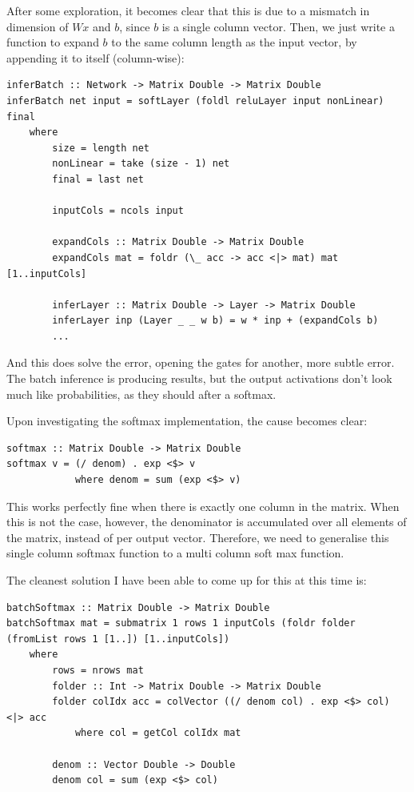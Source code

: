 \documentclass[12pt]{article}
\begin{document}
After some exploration, it becomes clear that this is due to a mismatch in dimension of $Wx$ and $b$, since $b$ is a single column vector. Then, we just write a function to expand $b$ to the same column length as the input vector, by appending it to itself (column-wise):
\begin{lstlisting}
inferBatch :: Network -> Matrix Double -> Matrix Double
inferBatch net input = softLayer (foldl reluLayer input nonLinear) final
	where
		size = length net
		nonLinear = take (size - 1) net
		final = last net

		inputCols = ncols input

        expandCols :: Matrix Double -> Matrix Double
        expandCols mat = foldr (\_ acc -> acc <|> mat) mat [1..inputCols]

		inferLayer :: Matrix Double -> Layer -> Matrix Double
		inferLayer inp (Layer _ _ w b) = w * inp + (expandCols b)
		...
\end{lstlisting}
And this does solve the error, opening the gates for another, more subtle error. The batch inference is producing results, but the output activations don't look much like probabilities, as they should after a softmax.\bigskip

Upon investigating the softmax implementation, the cause becomes clear:
\begin{lstlisting}
softmax :: Matrix Double -> Matrix Double
softmax v = (/ denom) . exp <$> v
			where denom = sum (exp <$> v)	
\end{lstlisting}
This works perfectly fine when there is exactly one column in the matrix. When this is not the case, however, the denominator is accumulated over all elements of the matrix, instead of per output vector. Therefore, we need to generalise this single column softmax function to a multi column soft max function.\bigskip

The cleanest solution I have been able to come up for this at this time is:
\begin{lstlisting}
batchSoftmax :: Matrix Double -> Matrix Double
batchSoftmax mat = submatrix 1 rows 1 inputCols (foldr folder (fromList rows 1 [1..]) [1..inputCols])
	where
		rows = nrows mat
		folder :: Int -> Matrix Double -> Matrix Double
		folder colIdx acc = colVector ((/ denom col) . exp <$> col) <|> acc
			where col = getCol colIdx mat

		denom :: Vector Double -> Double
		denom col = sum (exp <$> col)
\end{lstlisting}
\end{document}
